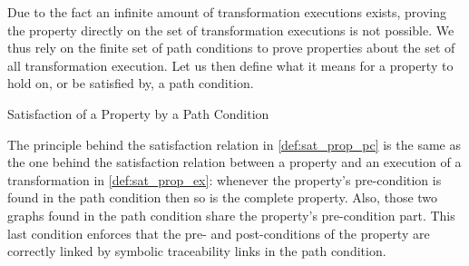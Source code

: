 % 
% 
% 

Due to the fact an infinite amount of transformation executions exists, proving the property directly on the set of transformation executions is not possible. We thus rely on the finite set of path conditions to prove properties about the set of all transformation execution. Let us then define what it means for a property to hold on, or be satisfied by, a path condition.  

\begin{definition}{Satisfaction of a Property by a Path Condition\\}
\label{def:sat_prop_pc}
\end{definition}

The principle behind the satisfaction relation in \cref{def:sat_prop_pc} is the same as the one behind the satisfaction relation between a property and an execution of a transformation in \cref{def:sat_prop_ex}: whenever the property's pre-condition is found in the path condition then so is the complete property. Also, those two graphs found in the path condition share the property's pre-condition part. This last condition enforces that the pre- and post-conditions of the property are correctly linked by symbolic traceability links in the path condition.

